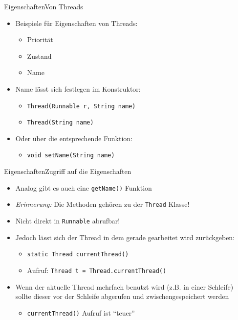 \begin{frame}{Eigenschaften}{Von Threads}
    \begin{itemize}
        \item Beispiele für Eigenschaften von Threads:
        \begin{itemize}
            \item Priorität
            \item Zustand
            \item Name
        \end{itemize}
        \item Name lässt sich festlegen im Konstruktor:
        \begin{itemize}
            \item \texttt{Thread(Runnable r, String name)}
            \item \texttt{Thread(String name)}
        \end{itemize}
        \item Oder über die entsprechende Funktion:
        \begin{itemize}
            \item \texttt{void setName(String name)}
        \end{itemize}
    \end{itemize}
\end{frame}

\begin{frame}{Eigenschaften}{Zugriff auf die Eigenschaften}
    \begin{itemize}
        \item Analog gibt es auch eine \texttt{getName()} Funktion
        \item \textit{Erinnerung:} Die Methoden gehören zu der \texttt{Thread} Klasse!
        \item Nicht direkt in \texttt{Runnable} abrufbar!
        \item Jedoch lässt sich der Thread in dem gerade gearbeitet wird zurückgeben:
        \begin{itemize}
            \item \texttt{static Thread currentThread()}
            \item Aufruf: \texttt{Thread t = Thread.currentThread()}
        \end{itemize}
        \item Wenn der aktuelle Thread mehrfach benutzt wird (z.B. in einer Schleife) sollte dieser vor der Schleife abgerufen und zwischengespeichert werden
        \begin{itemize}
            \item \texttt{currentThread()} Aufruf ist "`teuer"'
        \end{itemize}
    \end{itemize}
\end{frame}

